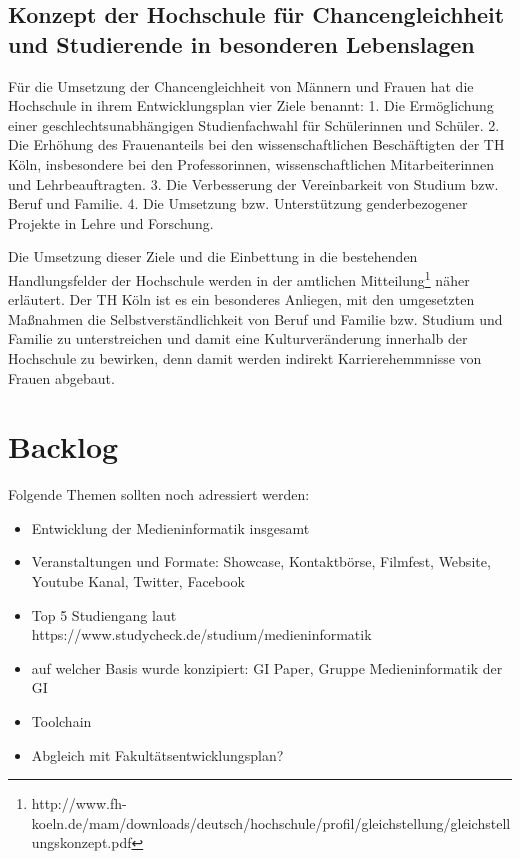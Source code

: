 \section{Konzept der Hochschule für Chancengleichheit und Studierende
in besonderen
Lebenslagen}\label{konzept-der-hochschule-fuxfcr-chancengleichheit-und-studierende-in-besonderen-lebenslagen}

Für die Umsetzung der Chancengleichheit von Männern und Frauen hat die
Hochschule in ihrem Entwicklungsplan vier Ziele benannt: 1. Die
Ermöglichung einer geschlechtsunabhängigen Studienfachwahl für
Schülerinnen und Schüler. 2. Die Erhöhung des Frauenanteils bei den
wissenschaftlichen Beschäftigten der TH Köln, insbesondere bei den
Professorinnen, wissenschaftlichen Mitarbeiterinnen und
Lehrbeauftragten. 3. Die Verbesserung der Vereinbarkeit von Studium bzw.
Beruf und Familie. 4. Die Umsetzung bzw. Unterstützung genderbezogener
Projekte in Lehre und Forschung.

Die Umsetzung dieser Ziele und die Einbettung in die bestehenden
Handlungsfelder der Hochschule werden in der amtlichen
Mitteilung\footnote{http://www.fh-koeln.de/mam/downloads/deutsch/hochschule/profil/gleichstellung/gleichstellungskonzept.pdf}
näher erläutert. Der TH Köln ist es ein besonderes Anliegen, mit den
umgesetzten Maßnahmen die Selbstverständlichkeit von Beruf und Familie
bzw. Studium und Familie zu unterstreichen und damit eine
Kulturveränderung innerhalb der Hochschule zu bewirken, denn damit
werden indirekt Karrierehemmnisse von Frauen abgebaut.

\chapter{Backlog}\label{backlog}

Folgende Themen sollten noch adressiert werden:

\begin{itemize}
\tightlist
\item
  Entwicklung der Medieninformatik insgesamt
\item
  Veranstaltungen und Formate: Showcase, Kontaktbörse, Filmfest,
  Website, Youtube Kanal, Twitter, Facebook
\item
  Top 5 Studiengang laut
  https://www.studycheck.de/studium/medieninformatik
\item
  auf welcher Basis wurde konzipiert: GI Paper, Gruppe Medieninformatik
  der GI
\item
  Toolchain
\item
  Abgleich mit Fakultätsentwicklungsplan?
\end{itemize}


